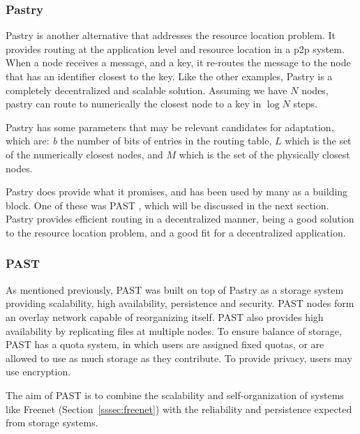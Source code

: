 \subsubsection{Pastry}
\label{sssec:pastry}
\par Pastry \cite{Rowstron2001} is another alternative that addresses the resource location problem. It provides routing at the application level and resource location in a \gls{p2p} system. When a node receives a message, and a key, it re-routes the message to the node that has an identifier closest to the key. Like the other examples, Pastry is a completely decentralized and scalable solution. Assuming we have $N$ nodes, pastry can route to numerically the closest node to a key in $\log N$ steps.
\par Pastry has some parameters that may be relevant candidates for adaptation, which are: \textit{b} the number of bits of entries in the routing table, $L$ which is the set of the numerically closest nodes, and $M$ which is the set of the physically closest nodes.%
\par Pastry does provide what it promises, and has been used by many as a building block. One of these was PAST \cite{Druschel2001}, which will be discussed in the next section. Pastry provides efficient routing in a decentralized manner, being a good solution to the resource location problem, and a good fit for a decentralized application.%
%
%
%
\subsubsection{PAST}
\label{sssec:past}
\par As mentioned previously, PAST \cite{Druschel2001} was built on top of Pastry as a storage system providing scalability, high availability, persistence and security. PAST nodes form an overlay network capable of reorganizing itself. PAST also provides high availability by replicating files at multiple nodes. To ensure balance of storage, PAST has a quota system, in which users are assigned fixed quotas, or are allowed to use as much storage as they contribute. To provide privacy, users may use encryption.
\par The aim of PAST is to combine the scalability and self-organization of systems like Freenet (Section~\ref{sssec:freenet}) with the reliability and persistence expected from storage systems.
%
%
%
%
%
%
